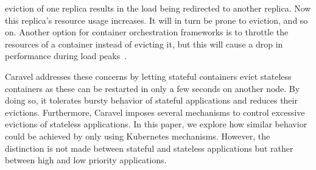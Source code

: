 eviction of one replica results in the load being redirected to another replica. Now this replica's resource usage increases. It will in turn be prone to eviction, and so on. Another option for container orchestration frameworks is to throttle the resources of a container instead of evicting it, but this will cause a drop in performance during load peaks~\citep{caravel}.

Caravel addresses these concerns by letting stateful containers evict stateless containers as these can be restarted in only a few seconds on another node. 
By doing so, it tolerates bursty behavior of stateful applications and reduces their evictions. Furthermore, Caravel imposes several mechanisms to control excessive evictions of stateless applications. In this paper, we explore how similar behavior could be achieved by only using Kubernetes mechanisms. However, the distinction is not made between stateful and stateless applications but rather between high and low priority applications. 

